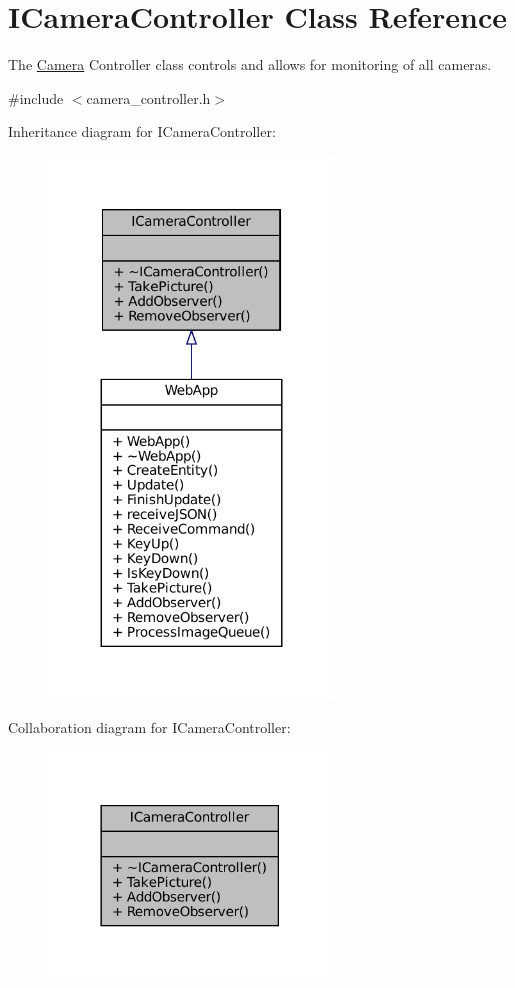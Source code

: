 \hypertarget{classICameraController}{}\section{I\+Camera\+Controller Class Reference}
\label{classICameraController}


The \hyperlink{classCamera}{Camera} Controller class controls and allows for monitoring of all cameras.  




{\ttfamily \#include $<$camera\+\_\+controller.\+h$>$}



Inheritance diagram for I\+Camera\+Controller\+:\nopagebreak
\begin{figure}[H]
\begin{center}
\leavevmode
\includegraphics[width=215pt]{classICameraController__inherit__graph}
\end{center}
\end{figure}


Collaboration diagram for I\+Camera\+Controller\+:\nopagebreak
\begin{figure}[H]
\begin{center}
\leavevmode
\includegraphics[width=213pt]{classICameraController__coll__graph}
\end{center}
\end{figure}

